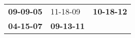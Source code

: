 \begin{supertabular}{p{0.33\columnwidth}p{0.33\columnwidth}p{0.33\columnwidth}}
 \textbf{09-09-05\textsuperscript{}} &           11-18-09\textsuperscript{} &  \textbf{10-18-12\textsuperscript{}} \\
 \textbf{04-15-07\textsuperscript{}} &  \textbf{09-13-11\textsuperscript{}} &                                      \\
\end{supertabular}
